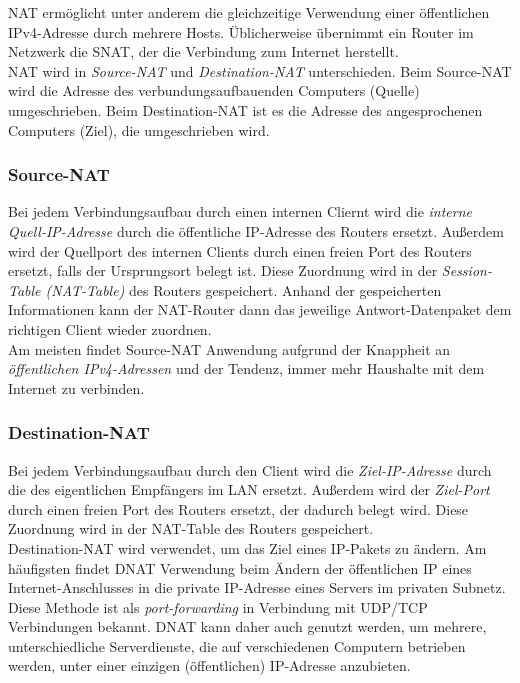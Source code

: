 \documentclass[a4paper, 12pt]{report}
\begin{document}
NAT ermöglicht unter anderem die gleichzeitige Verwendung einer öffentlichen 
IPv4-Adresse durch mehrere Hosts. Üblicherweise übernimmt ein Router im Netzwerk
die SNAT, der die Verbindung zum Internet herstellt. \\

NAT wird in \emph{Source-NAT} und \emph{Destination-NAT} unterschieden. Beim 
Source-NAT wird die Adresse des verbundungsaufbauenden Computers (Quelle) 
umgeschrieben. Beim Destination-NAT ist es die Adresse des angesprochenen 
Computers (Ziel), die umgeschrieben wird. 

\subsubsection{Source-NAT}

Bei jedem Verbindungsaufbau durch einen internen Cliernt wird die \emph{interne 
Quell-IP-Adresse} durch die öffentliche IP-Adresse des Routers ersetzt. Außerdem 
wird der Quellport des internen Clients durch einen freien Port des Routers 
ersetzt, falls der Ursprungsort belegt ist. Diese Zuordnung wird in der 
\emph{Session-Table (NAT-Table)} des Routers gespeichert. Anhand der 
gespeicherten Informationen kann der NAT-Router dann das jeweilige 
Antwort-Datenpaket dem richtigen Client wieder zuordnen. \\

Am meisten findet Source-NAT Anwendung aufgrund der Knappheit an 
\emph{öffentlichen IPv4-Adressen} und der Tendenz, immer mehr Haushalte mit dem
Internet zu verbinden. 

\subsubsection{Destination-NAT}

Bei jedem Verbindungsaufbau durch den Client wird die \emph{Ziel-IP-Adresse} 
durch die des eigentlichen Empfängers im LAN ersetzt. Außerdem wird der 
\emph{Ziel-Port} durch einen freien Port des Routers ersetzt, der dadurch 
belegt wird. Diese Zuordnung wird in der NAT-Table des Routers gespeichert. \\

Destination-NAT wird verwendet, um das Ziel eines IP-Pakets zu ändern. Am 
häufigsten findet DNAT Verwendung beim Ändern der öffentlichen IP eines 
Internet-Anschlusses in die private IP-Adresse eines Servers im privaten 
Subnetz. Diese Methode ist als \emph{port-forwarding} in Verbindung mit UDP/TCP 
Verbindungen bekannt. DNAT kann daher auch genutzt werden, um mehrere, 
unterschiedliche Serverdienste, die auf verschiedenen Computern betrieben 
werden, unter einer einzigen (öffentlichen) IP-Adresse anzubieten. 
\end{document}
